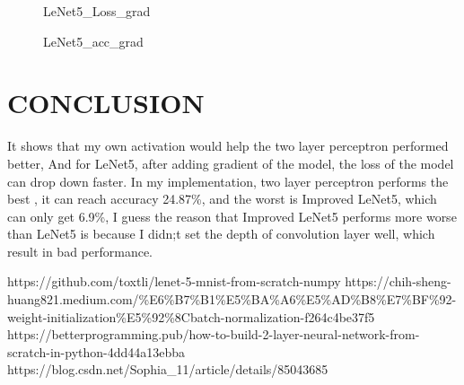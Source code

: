 \documentclass[conference]{IEEEtran}
\begin{document}
    \begin{figure}[htb]
        \centering
        \renewcommand{\figurename}{Figure}
            
        \caption{LeNet5\_Loss\_grad}
        \label{fig:loss_grad}
    \end{figure}

    \begin{figure}[htb]
        \centering
        \renewcommand{\figurename}{Figure}
        \caption{LeNet5\_acc\_grad}
        \label{fig:acc_grad}
    \end{figure}



        
        
\section{CONCLUSION}
It shows that my own activation would help the two layer perceptron performed better, And for LeNet5, after adding gradient of the model, the loss of the model can drop down faster.
\indent In my implementation, two layer perceptron performs the best , it can reach accuracy 24.87\%, and the worst is Improved LeNet5, which can only get 6.9\%, I guess the reason that Improved LeNet5 performs more worse than LeNet5 is because I didn;t set the depth of convolution layer well, which result in bad performance.



\begin{thebibliography}{00}
 https://github.com/toxtli/lenet-5-mnist-from-scratch-numpy
 https://chih-sheng-huang821.medium.com/\%E6\%B7\%B1\%E5\%BA\%A6\%E5\%AD\%B8\%E7\%BF\%92-weight-initialization\%E5\%92\%8Cbatch-normalization-f264c4be37f5
 https://betterprogramming.pub/how-to-build-2-layer-neural-network-from-scratch-in-python-4dd44a13ebba
 https://blog.csdn.net/Sophia\_11/article/details/85043685
\end{thebibliography}
\end{document}
